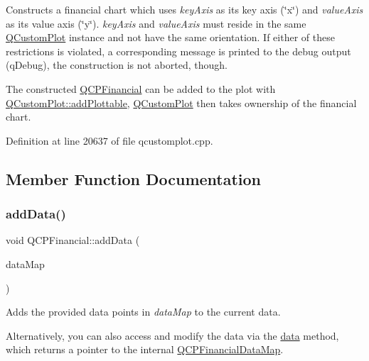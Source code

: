 Constructs a financial chart which uses {\itshape key\+Axis} as its key axis (\char`\"{}x\char`\"{}) and {\itshape value\+Axis} as its value axis (\char`\"{}y\char`\"{}). {\itshape key\+Axis} and {\itshape value\+Axis} must reside in the same \hyperlink{class_q_custom_plot}{Q\+Custom\+Plot} instance and not have the same orientation. If either of these restrictions is violated, a corresponding message is printed to the debug output (q\+Debug), the construction is not aborted, though.

The constructed \hyperlink{class_q_c_p_financial}{Q\+C\+P\+Financial} can be added to the plot with \hyperlink{class_q_custom_plot_ab7ad9174f701f9c6f64e378df77927a6}{Q\+Custom\+Plot\+::add\+Plottable}, \hyperlink{class_q_custom_plot}{Q\+Custom\+Plot} then takes ownership of the financial chart. 

Definition at line 20637 of file qcustomplot.\+cpp.



\subsection{Member Function Documentation}
\mbox{\label{class_q_c_p_financial_a1a83396f97fcc68f2b7aa8d9782feffe}} 
\subsubsection{\texorpdfstring{add\+Data()}{addData()}\hspace{0.1cm}{\footnotesize\ttfamily [1/4]}}
{\footnotesize\ttfamily void Q\+C\+P\+Financial\+::add\+Data (\begin{DoxyParamCaption}\item[{const \hyperlink{qcustomplot_8h_a745c09823fae0974b50beca9bc3b3d7d}{Q\+C\+P\+Financial\+Data\+Map} \&}]{data\+Map }\end{DoxyParamCaption})}

Adds the provided data points in {\itshape data\+Map} to the current data.

Alternatively, you can also access and modify the data via the \hyperlink{class_q_c_p_financial_a528c81578e4f25999a9169127763cfd4}{data} method, which returns a pointer to the internal \hyperlink{qcustomplot_8h_a745c09823fae0974b50beca9bc3b3d7d}{Q\+C\+P\+Financial\+Data\+Map}.

